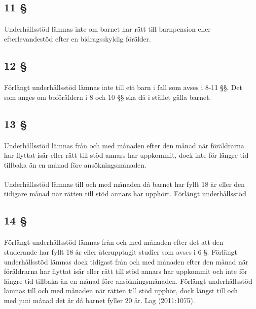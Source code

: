 \documentclass[a4paper,notitlepage,openany,10pt]{book}
\begin{document}
\subsection*{11 §}
\paragraph*{}
Underhållsstöd lämnas inte om barnet har rätt till barnpension eller efterlevandestöd efter en bidragsskyldig förälder.
\subsection*{12 §}
\paragraph*{}
Förlängt underhållsstöd lämnas inte till ett barn i fall som avses i 8-11 §§. Det som anges om boföräldern i 8 och 10 §§ ska då i stället gälla barnet.
\subsection*{13 §}
\paragraph*{}
Underhållsstöd lämnas från och med månaden efter den månad när föräldrarna har flyttat isär eller rätt till stöd annars har uppkommit, dock inte för längre tid tillbaka än en månad före ansökningsmånaden.
\paragraph*{}
Underhållsstöd lämnas till och med månaden då barnet har fyllt 18 år eller den tidigare månad när rätten till stöd annars har upphört.
Förlängt underhållsstöd
\subsection*{14 §}
\paragraph*{}
Förlängt underhållsstöd lämnas från och med månaden efter det att den studerande har fyllt 18 år eller återupptagit studier som avses i 6 §. Förlängt underhållsstöd lämnas dock tidigast från och med månaden efter den månad när föräldrarna har flyttat isär eller rätt till stöd annars har uppkommit och inte för längre tid tillbaka än en månad före ansökningsmånaden.
Förlängt underhållsstöd lämnas till och med månaden när rätten till stöd upphör, dock längst till och med juni månad det år då barnet fyller 20 år.
Lag (2011:1075).
\end{document}
